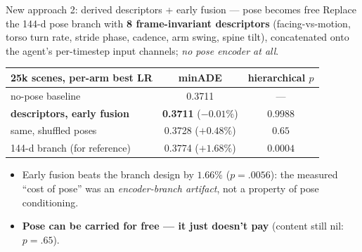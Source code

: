 \documentclass[10pt,aspectratio=169]{beamer}
\newcommand{\ok}[1]{\textcolor{good}{#1}}
\begin{document}
\begin{frame}{New approach 2: derived descriptors + early fusion --- pose becomes free}
Replace the 144-d pose branch with \textbf{8 frame-invariant descriptors}
(facing-vs-motion, torso turn rate, stride phase, cadence, arm swing, spine tilt),
concatenated onto the agent's per-timestep input channels; \emph{no pose encoder at all}.
\begin{center}\small
\begin{tabular}{lcc}
\toprule
25k scenes, per-arm best LR & minADE & hierarchical $p$ \\
\midrule
no-pose baseline & 0.3711 & --- \\
\textbf{descriptors, early fusion} & \textbf{0.3711} ($-0.01\%$) & $0.9988$ \\
same, shuffled poses & 0.3728 ($+0.48\%$) & $0.65$ \\
144-d branch (for reference) & 0.3774 ($+1.68\%$) & $0.0004$ \\
\bottomrule
\end{tabular}
\end{center}
\begin{itemize}
  \item Early fusion beats the branch design by \ok{$1.66\%$ ($p{=}.0056$)}: the measured
        ``cost of pose'' was an \emph{encoder-branch artifact}, not a property of pose conditioning.
  \item \textbf{Pose can be carried for free --- it just doesn't pay} (content still nil: $p{=}.65$).
\end{itemize}
\end{frame}
\end{document}

